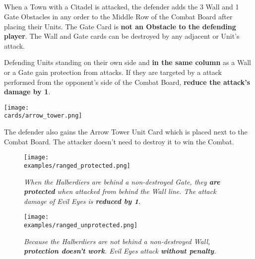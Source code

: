 \begin{multicols}{2}
\subsection*{}
When a Town with a Citadel is attacked, the defender adds the 3 Wall and 1 Gate Obstacles in any order to the Middle Row of the Combat Board after placing their Units.
The Gate Card is \textbf{not an Obstacle to the defending player}.
The Wall and Gate cards can be destroyed by any adjacent  or  Unit's attack.
\par
Defending Units standing on their own side and \textbf{in the same column} as a Wall or a Gate gain protection from  attacks.
If they are targeted by a  attack performed from the opponent's side of the Combat Board, \textbf{reduce the attack's damage by 1}.

\columnbreak
\begin{center}
  \texttt{[image: \\cards/arrow\_tower.png]}
\end{center}
The defender also gains the Arrow Tower Unit Card which is placed next to the Combat Board.
The attacker doesn't need to destroy it to win the Combat.
\end{multicols}

\vfill
\begin{figure*}[h]
  \mbox{}%
  \hfill%
  \begin{minipage}[t]{0.415\textwidth}
    \centering
    \texttt{[image: \\examples/ranged\_protected.png]}
  \caption[halberdiers protected]{\textit{When the Halberdiers are behind a non-destroyed Gate, they \textbf{are protected} when attacked from behind the Wall line.
    The  attack damage of Evil Eyes is \textbf{reduced by 1}.}}
  \end{minipage}
  \hfill%
  \begin{minipage}[t]{0.415\textwidth}
    \centering
    \texttt{[image: \\examples/ranged\_unprotected.png]}
    \caption[halberdiers unprotected]{\textit{Because the Halberdiers are not behind a non-destroyed Wall, \textbf{protection doesn't work}.
      Evil Eyes attack \textbf{without penalty}.}}
  \end{minipage}
  \hfill%
  \mbox{}%
\end{figure*}


